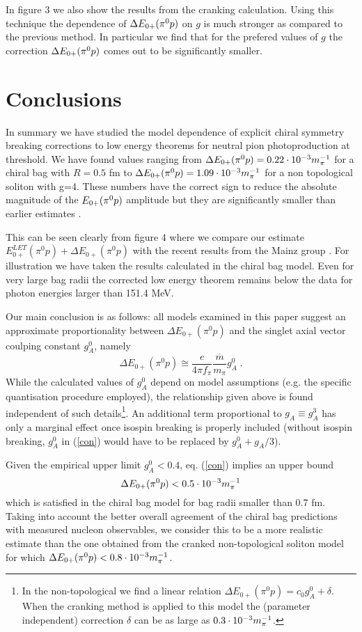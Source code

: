 In figure 3 we also show the results from the cranking calculation.
Using this technique the dependence of $\Delta E_{0+}(\pi^0 p)$ on $g$ is much stronger
as compared to the previous method. In particular we find that for
the prefered values of $g$ the correction $\Delta E_{0+}(\pi^0 p)$ comes out to
be significantly smaller.

\section{Conclusions}
In summary we have studied the model dependence of explicit chiral
symmetry breaking corrections to low energy theorems for neutral pion
photoproduction at threshold. We have found values ranging from 
$\Delta E_{0+}(\pi^0 p)=0.22\cdot 10^{-3}m_{\pi}^{-1}$ for a chiral bag with $R=0.5$ fm to $\Delta E_{0+}(\pi^0 p)
=1.09\cdot 10^{-3}m_{\pi}^{-1}$ for a non topological soliton with g=4.
These numbers have the correct sign to
reduce the absolute magnitude of the $E_{0+}(\pi^0 p)$ amplitude but they are
significantly smaller than  earlier estimates \cite{Nat}.

This can be seen clearly from figure 4 where we compare our 
estimate $E_{0+}^{LET}(\pi^0 p)+\Delta E_{0+}(\pi^0 p)$ with
the recent results from the Mainz group \cite{Bec}. For 
illustration we have taken the results calculated in the chiral bag
model. Even for very large bag radii the corrected low energy 
theorem remains below the data for photon energies larger than 
151.4 MeV.

Our main conclusion is as follows: all models examined in this paper
suggest an approximate proportionality between $\Delta E_{0+}(\pi^0 p)$
and the singlet axial vector coulping constant $g_A^0$, namely
\begin{equation}
\label{con}
\Delta E_{0+}(\pi^0p) \cong \frac{e}{4 \pi f_\pi} \frac{\overline{m}}{m_\pi}
 g_A^0 \; .
\end{equation}
While the calculated values of $g_A^0$ depend on model assumptions
(e.g. the specific quantisation procedure employed), the  relationship
given above is found independent of such details\footnote{In the 
non-topological we find a linear relation $\Delta E_{0+}(\pi^0 p)
= c_0 g_A^0 + \delta $. When the cranking method is applied
to this model the (parameter independent) correction $\delta $ can 
be as large as $0.3 \cdot 10^{-3}m_{\pi}^{-1}$.}. An additional term 
proportional to $g_A \equiv g_A^3$ has only a marginal effect once 
isospin breaking is properly included (without isospin breaking, $g_A^0$
in (\ref{con}) would have to be replaced by $g_A^0+g_A/3$).  

Given the empirical upper limit $g_A^0 < 0.4$, eq. (\ref{con}) implies an upper 
bound
\begin{equation}
\Delta E_{0+}(\pi^0p)< 0.5 \cdot 10^{-3}m_{\pi}^{-1} 
\end{equation}
which is satisfied in the chiral bag model
for bag radii smaller than 0.7 fm. Taking into
account the better overall agreement of the chiral bag predictions
with measured nucleon observables, we consider this to be a more realistic 
estimate than the one obtained from the cranked non-topological soliton
model for which $\Delta E_{0+}(\pi^0 p) < 0.8 \cdot 10^{-3}m_{\pi}^{-1}$. 

